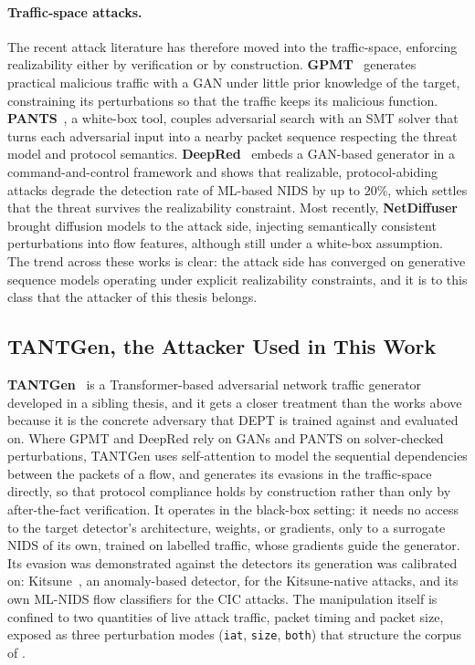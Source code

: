 \paragraph{Traffic-space attacks.}
The recent attack literature has therefore moved into the traffic-space, enforcing
realizability either by verification or by construction.
\textbf{GPMT}~\cite{sun2023gpmt} generates practical malicious traffic with a \ac{GAN}
under little prior knowledge of the target, constraining its perturbations so that the
traffic keeps its malicious function. \textbf{PANTS}~\cite{jin2025robustifying}, a
white-box tool, couples adversarial search with an \ac{SMT} solver that turns each
adversarial input into a nearby packet sequence respecting the threat model and protocol
semantics.
\textbf{DeepRed}~\cite{hajizadeh2025deepred} embeds a \ac{GAN}-based generator in a command-and-control framework and shows that realizable, protocol-abiding
attacks degrade the detection rate of ML-based \ac{NIDS} by up to $20\%$, which
settles that the threat survives the realizability constraint. Most recently,
\textbf{NetDiffuser}~\cite{kumar2026netdiffuser} brought diffusion models to the
attack side, injecting semantically consistent perturbations into flow features,
although still under a white-box assumption. The trend across these works is clear:
the attack side has converged on generative sequence models operating under explicit
realizability constraints, and it is to this class that the attacker of this
thesis belongs.

\subsection{TANTGen, the Attacker Used in This Work}\label{subsec:rel-tantgen}
\textbf{TANTGen}~\cite{pissarra2026tantgen} is a Transformer-based adversarial network
traffic generator developed in a sibling thesis, and it gets a closer treatment than the
works above because it is the concrete adversary that DEPT is trained against and
evaluated on. Where GPMT and
DeepRed rely on \ac{GAN}s and PANTS on solver-checked perturbations, TANTGen uses
self-attention to model the sequential dependencies between the packets of a flow, and
generates its evasions in the traffic-space directly, so that protocol compliance
holds by construction rather than only by after-the-fact verification. It operates in the
black-box setting: it needs no access to the target detector's architecture, weights,
or gradients, only to a surrogate \ac{NIDS} of its own, trained on labelled traffic, whose
gradients guide the generator. Its evasion was demonstrated against the detectors its
generation was calibrated on: Kitsune~\cite{mirsky2018kitsune}, an anomaly-based
detector, for the Kitsune-native attacks, and its own ML-NIDS flow classifiers for the
CIC attacks. The manipulation itself is
confined to two quantities of live attack traffic, packet timing and packet
size, exposed as three perturbation modes (\texttt{iat}, \texttt{size},
\texttt{both}) that structure the corpus of .

